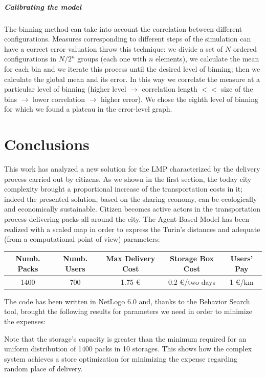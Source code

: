 \documentclass[11pt,a4paper]{article}
\begin{document}
\subparagraph*{Calibrating the model}


The binning method can take into account the correlation between different configurations. Measures corresponding to different steps of the simulation can have a correct error valuation throw this technique: we divide a set of $N$ ordered configurations in $N/2^n$ groups (each one with $n$ elements), we calculate the mean for each bin and we iterate this process until the desired level of binning; then we calculate the global mean and its error. In this way we correlate the measure at a particular level of binning (higher level $\rightarrow$ correlation length $<<$ size of the bins $\rightarrow$ lower correlation $\rightarrow$ higher error). We chose the eighth level of binning for which we found a plateau in the error-level graph. 

\newpage
\section{Conclusions}
This work has analyzed a new solution for the LMP characterized by the delivery process carried out by citizens. As we shown in the first section, the today city complexity brought a proportional increase of the transportation costs in it; indeed the presented solution, based on the sharing economy, can be ecologically and economically sustainable. Citizen becomes active actors in the transportation process delivering packs all around the city. The Agent-Based Model has been realized with a scaled map in order to express the Turin's distances and adequate (from a computational point of view) parameters:
\begin{center}
  \begin{tabular}{c|c|c|c|c}
    \hline
    Numb. Packs & Numb. Users & Max Delivery Cost & Storage Box Cost & Users' Pay \\
    \hline
    \hline
    1400 & 700 & 1.75 \euro{} & 0.2 \euro{}/two days & 1 \euro{}/km \\
    \hline
  \end{tabular}
\end{center}
The code has been written in NetLogo 6.0 and, thanks to the Behavior Search tool, brought the following results for parameters we need in order to minimize the expenses:
\begin{center}
\end{center}
Note that the storage's capacity is greater than the minimum required for an uniform distribution of 1400 packs in 10 storages. This shows how the complex system achieves a store optimization for minimizing the expense regarding random place of delivery.
\bigskip
\end{document}
